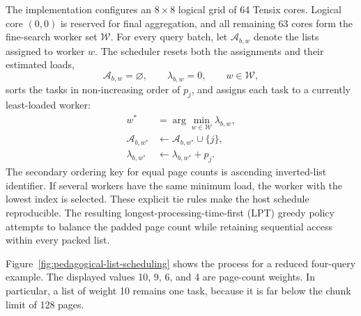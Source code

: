 The implementation configures an \(8\times8\) logical grid of 64 Tensix cores. Logical core \((0,0)\) is reserved for final aggregation, and all remaining 63 cores form the fine-search worker set \(\mathcal{W}\). For every query batch, let \(\mathcal{A}_{b,w}\) denote the lists assigned to worker \(w\). The scheduler resets both the assignments and their estimated loads,
\begin{equation}
\mathcal{A}_{b,w}=\varnothing,
\qquad
\lambda_{b,w}=0,
\qquad w\in\mathcal{W},
\end{equation}
sorts the tasks in non-increasing order of \(p_j\), and assigns each task to a currently least-loaded worker:
\begin{align}
w^*&=\arg\min_{w\in\mathcal{W}}\lambda_{b,w},\\
\mathcal{A}_{b,w^*}&\leftarrow\mathcal{A}_{b,w^*}\cup\{j\},\\
\lambda_{b,w^*}&\leftarrow\lambda_{b,w^*}+p_j.
\label{eq:greedy-list-assignment}
\end{align}
The secondary ordering key for equal page counts is ascending inverted-list identifier. If several workers have the same minimum load, the worker with the lowest index is selected. These explicit tie rules make the host schedule reproducible. The resulting longest-processing-time-first (LPT) greedy policy attempts to balance the padded page count while retaining sequential access within every packed list.

Figure~\ref{fig:pedagogical-list-scheduling} shows the process for a reduced four-query example. The displayed values 10, 9, 6, and 4 are page-count weights. In particular, a list of weight 10 remains one task, because it is far below the chunk limit of 128 pages.

